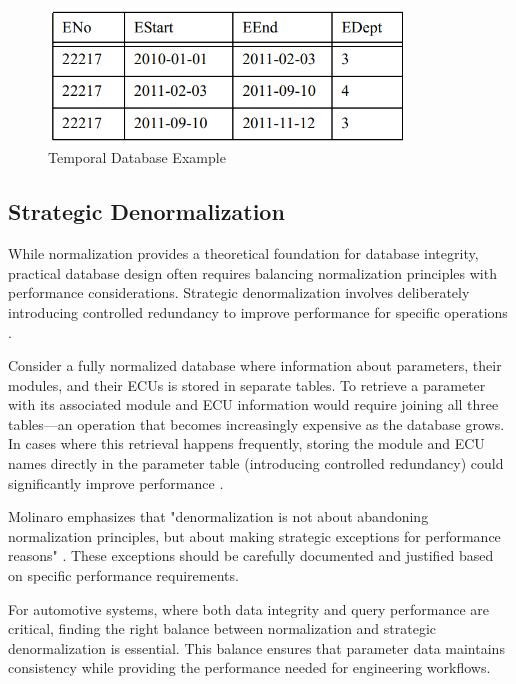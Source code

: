 \begin{figure}[ht]
    \centering
    \includegraphics[width=0.85\textwidth]{figures/temporal_database.png}
    \caption{Temporal Database Example \cite{kulkarni2012temporal}}
    \label{fig:temporal-database}
\end{figure}

\subsection{Strategic Denormalization}
\label{subsec:strategic-denormalization}

While normalization provides a theoretical foundation for database integrity, practical database design often requires balancing normalization principles with performance considerations. Strategic denormalization involves deliberately introducing controlled redundancy to improve performance for specific operations \cite{bhattacherjee2015principles}.

Consider a fully normalized database where information about parameters, their modules, and their ECUs is stored in separate tables. To retrieve a parameter with its associated module and ECU information would require joining all three tables—an operation that becomes increasingly expensive as the database grows. In cases where this retrieval happens frequently, storing the module and ECU names directly in the parameter table (introducing controlled redundancy) could significantly improve performance \cite{schwartz2012high}.

Molinaro emphasizes that "denormalization is not about abandoning normalization principles, but about making strategic exceptions for performance reasons" \cite{molinaro2005sql}. These exceptions should be carefully documented and justified based on specific performance requirements.

For automotive systems, where both data integrity and query performance are critical, finding the right balance between normalization and strategic denormalization is essential. This balance ensures that parameter data maintains consistency while providing the performance needed for engineering workflows.

